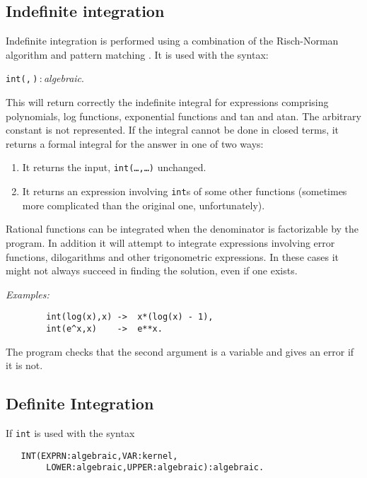 \subsection{Indefinite integration}
Indefinite
integration is performed using a
combination of the Risch-Norman algorithm and pattern matching \cite{Norman:77,Harrington:79,Norman:79}.
It is used with the syntax:
\begin{syntax}
  \texttt{int(}\texttt{,}\,\texttt{)}\,:\,\textit{algebraic}.
\end{syntax}
This will return correctly the indefinite integral for expressions comprising
polynomials, log functions, exponential functions and tan and atan. The
arbitrary constant is not represented. If the integral cannot be done in
closed terms, it returns a formal integral for the answer in one of two ways:
\begin{enumerate}
\item It returns the input, \texttt{int(\ldots,\ldots)} unchanged.

\item It returns an expression involving \texttt{int}s of some
      other functions (sometimes more complicated than
      the original one, unfortunately).
\end{enumerate}
Rational functions can be integrated when the denominator is factorizable
by the program. In addition it will attempt to integrate expressions
involving error functions, dilogarithms and other trigonometric
expressions. In these cases it might not always succeed in finding the
solution, even if one exists.

\textit{Examples:}
\begin{verbatim}
        int(log(x),x) ->  x*(log(x) - 1),
        int(e^x,x)    ->  e**x.
\end{verbatim}
The program checks that the second argument is a variable and gives an
error if it is not.

\subsection{Definite Integration} 

If \texttt{int} is used with the syntax

\begin{verbatim}
   INT(EXPRN:algebraic,VAR:kernel,
        LOWER:algebraic,UPPER:algebraic):algebraic.
\end{verbatim}

